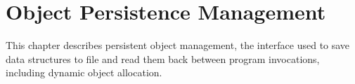 
\chapter{Object Persistence Management}
\label{sec:persistent}

This chapter describes persistent object management, 
the interface used to save data structures to file and read them back
between program invocations, including dynamic object allocation.  

